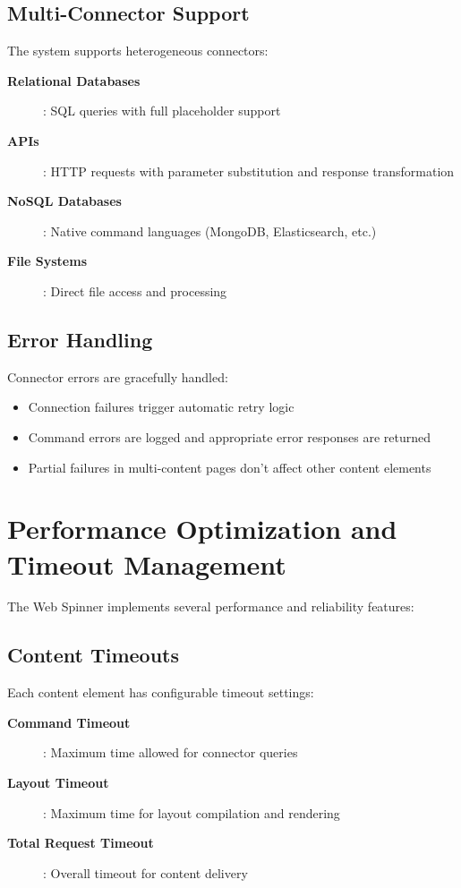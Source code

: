 \subsection{Multi-Connector Support}

The system supports heterogeneous connectors:

\begin{description}
	\item[\textbf{Relational Databases}]: SQL queries with full \wbpl{} placeholder support
	\item[\textbf{\rest{} APIs}]: HTTP requests with parameter substitution and response transformation
	\item[\textbf{NoSQL Databases}]: Native command languages (MongoDB, Elasticsearch, etc.)
	\item[\textbf{File Systems}]: Direct file access and processing
\end{description}

\subsection{Error Handling}

Connector errors are gracefully handled:
\begin{itemize}
	\item Connection failures trigger automatic retry logic
	\item Command errors are logged and appropriate error responses are returned
	\item Partial failures in multi-content pages don't affect other content elements
\end{itemize}

\section{Performance Optimization and Timeout Management}
\label{sec:performance-optimization}

The Web Spinner implements several performance and reliability features:

\subsection{Content Timeouts}

Each content element has configurable timeout settings:

\begin{description}
	\item[\textbf{Command Timeout}]: Maximum time allowed for connector queries
	\item[\textbf{Layout Timeout}]: Maximum time for layout compilation and rendering
	\item[\textbf{Total Request Timeout}]: Overall timeout for content delivery
\end{description}

